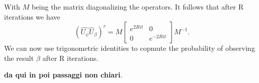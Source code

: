  With $M$ being the matrix diagonalizing the operators. It follows that after R iterations we have
\begin{equation*}
    (\hat{U_\psi}\hat{U}_\beta)^r = M  \begin{bmatrix}
    e^{2Rit} & 0 \\
    0 & e^{-2Rit}
    \end{bmatrix}  M^{-1}.
\end{equation*}
We can now use trigonometric identities to copmute the probability of observing the result $\beta$ after R iterations.

\textbf{da qui in poi passaggi non chiari}.